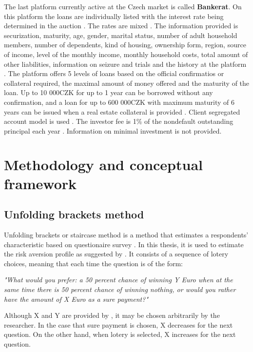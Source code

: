 The last platform currently active at the Czech market is called \textbf{Bankerat}. On this platform the loans are individually listed with the interest rate being determined in the auction \cite[]{BankeratTrziste}. The rates are mixed \cite[]{BankeratJakToFunguje}. The information provided is securization, maturity, age, gender, marital status, number of adult household members, number of dependents, kind of housing, ownership form, region, source of income, level of the monthly income, monthly household costs, total amount of other liabilities, information on seizure and trials and the history at the platform \cite[]{BankeratTrziste}. The platform offers 5 levels of loans based on the official confirmatios or collateral required, the maximal amount of money offered and the maturity of the loan. Up to 10 000CZK for up to 1 year can be borrowed without any confirmation, and a loan for up to 600 000CZK with maximum maturity of 6 years can be issued when a real estate collateral is provided \cite[]{BankeratPujcka}. Client segregated account model is used \cite[]{BankeratSmlouva}. The investor fee is 1\% of the nondefault outstanding principal each year \cite[]{BankeratPoplatky}. Information on minimal investment is not provided. 

\newpage
\section{Methodology and conceptual framework}

\subsection{Unfolding brackets method}

Unfolding brackets or staircase method is a method that estimates a respondents' characteristic based on questionaire survey \cite[]{Falk2016}. In this thesis, it is used to estimate the risk aversion profile as suggested by \cite{Falk2016}. It consists of a sequence of lotery choices, meaning that each time the question is of the form:

\textit{"What would you prefer: a 50 percent chance of winning Y Euro when at the same time there is 50 percent chance of winning nothing, or would you rather have the amount of X Euro as a sure payment?"}

Although X and Y are provided by \cite{Falk2016}, it may be chosen arbitrarily by the researcher. In the case that sure payment is chosen, X decreases for the next question. On the other hand, when lotery is selected, X increases for the next question.


